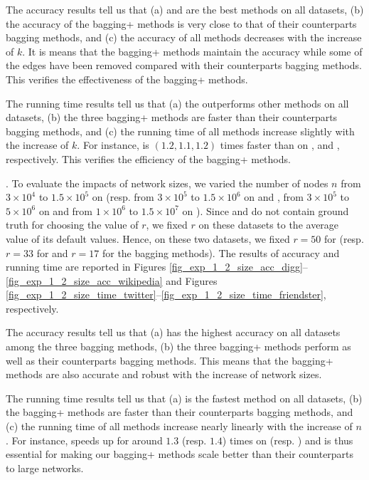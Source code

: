 The accuracy results tell us that
(a) \Biased and \Biasedp are the best methods on all datasets,
(b) the accuracy of the bagging+ methods is very close to that
of their counterparts bagging methods, and (c) the accuracy of all
methods decreases with the increase of $k$. It is means that the
bagging+ methods maintain the accuracy while some of the
edges have been removed compared with their counterparts bagging methods.
This verifies the effectiveness of the bagging+ methods.


The running time results tell us that (a) the \Biasedp outperforms
other methods on all datasets, (b) the three bagging+ methods are faster
than their counterparts bagging methods, and (c) the running time of all
methods increase slightly with the increase of $k$. For instance,
\Biasedp is $(1.2, 1.1, 1.2)$ times faster than
\Biased on \Digg, \YouTube and \Wikipedia, respectively.
This verifies the efficiency of the bagging+ methods.







. To evaluate the impacts of network sizes, we varied the
number of nodes $n$ from $3\times 10^4$ to $1.5\times 10^5$ on \Digg (resp.
from $3\times 10^5$ to $1.5\times 10^6$ on \YouTube and \Wikipedia,
from $3\times 10^5$ to $5\times 10^6$ on \Twitter and
from $1\times 10^6$ to $1.5\times 10^7$ on \Friendster).
Since \Twitter and \Friendster do not contain ground truth for choosing the value of $r$,
we fixed $r$ on these datasets to the average value of
its default values. Hence, on these two datasets, we fixed $r = 50$ for \NMF
(resp. $r = 33$ for \BIGCLAM and $r = 17$ for the bagging methods). The results
of accuracy and running time are reported in Figures \ref{fig_exp_1_2_size_acc_digg}--\ref{fig_exp_1_2_size_acc_wikipedia}
and Figures \ref{fig_exp_1_2_size_time_twitter}--\ref{fig_exp_1_2_size_time_friendster}, respectively.



The accuracy results tell us that (a) \Biased has the highest accuracy on all
datasets among the three bagging methods, (b) the three bagging+ methods perform as well as their counterparts
bagging methods. This means that the bagging+ methods are also accurate and
robust with the increase of network sizes.

The running time results tell us that (a) \Biasedp is the fastest method on all
datasets, (b) the bagging+ methods are faster than their counterparts bagging
methods, and (c) the running time of all methods increase nearly linearly with the
increase of $n$. For instance, \Biasedp speeds up \Biased for around
$1.3$ (resp. $1.4$) times on \Twitter (resp. \Friendster) and is thus essential for
making our bagging+ methods scale better than their counterparts to large networks.


